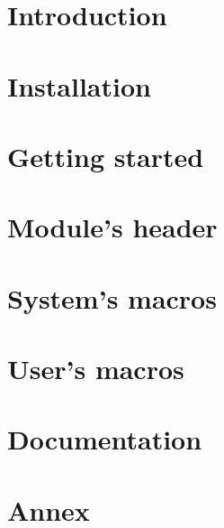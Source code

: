 \documentclass[a4paper, 12pt]{book}
\begin{document}


\tableofcontents
\newpage

\chapter{Introduction}
\label{intro}

\newpage

\chapter{Installation}
\label{install}

\newpage

\chapter{Getting started}
\label{start}

\newpage

\chapter{Module's header}
\label{header}

\newpage

\chapter{System's macros}
\label{sysmacros}

\newpage

\chapter{User's macros}
\label{usermacros}

\newpage

\chapter{Documentation}
\label{document}

\newpage

\chapter{Annex}
\label{annex}

\newpage

\printindex
\end{document}
